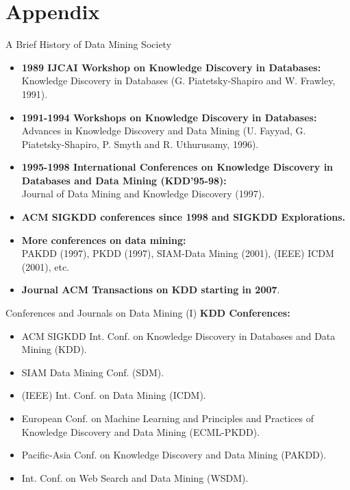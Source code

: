 \section*{Appendix}

\begin{frame}{A Brief History of Data Mining Society}
	\begin{itemize}
		\item \textbf{1989 IJCAI Workshop on Knowledge Discovery in
			      Databases:}\\
		      Knowledge Discovery in Databases (G. Piatetsky-Shapiro and W. Frawley,
		      1991).
		\item \textbf{1991-1994 Workshops on Knowledge Discovery in
			      Databases:}\\
		      Advances in Knowledge Discovery and Data Mining (U. Fayyad, G.
		      Piatetsky-Shapiro, P. Smyth and R. Uthurusamy, 1996).
		\item \textbf{1995-1998 International Conferences on Knowledge
			      Discovery in Databases and Data Mining (KDD’95-98):}\\
		      Journal of Data Mining and Knowledge Discovery (1997).
		\item \textbf{ACM SIGKDD conferences since 1998 and SIGKDD
			      Explorations.}\\
		\item \textbf{More conferences on data mining:}\\
		      PAKDD (1997), PKDD (1997), SIAM-Data Mining (2001), (IEEE) ICDM (2001),
		      etc.
		\item \textbf{Journal ACM Transactions on KDD starting in 2007}.
	\end{itemize}
\end{frame}

\begin{frame}{Conferences and Journals on Data Mining (I)}
	\textbf{KDD Conferences:}
	\begin{itemize}
		\item ACM SIGKDD Int. Conf. on Knowledge Discovery in Databases and
		      Data Mining (KDD).
		\item SIAM Data Mining Conf. (SDM).
		\item (IEEE) Int. Conf. on Data Mining (ICDM).
		\item European Conf. on Machine Learning and Principles and Practices
		      of Knowledge Discovery and Data Mining (ECML-PKDD).
		\item Pacific-Asia Conf. on Knowledge Discovery and Data Mining (PAKDD).
		\item Int. Conf. on Web Search and Data Mining (WSDM).
	\end{itemize}
\end{frame}

